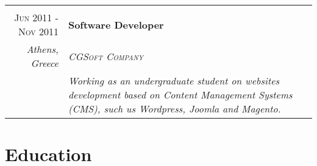 \documentclass[11pt]{article}
\begin{document}
\begin{longtable}{r|p{12.5cm}}

\multicolumn{2}{c}{} \\
\textsc{Jun 2011 - Nov 2011} & \textbf{Software Developer} \\
\footnotesize{\textit{Athens, Greece}} & \emph{\textsc{CGSoft Company}} \\
& \footnotesize{\textit{Working as an undergraduate student on websites development based on Content Management Systems (CMS), such us Wordpress, Joomla and Magento.}} \\

\end{longtable}

\section{Education}
\end{document}

